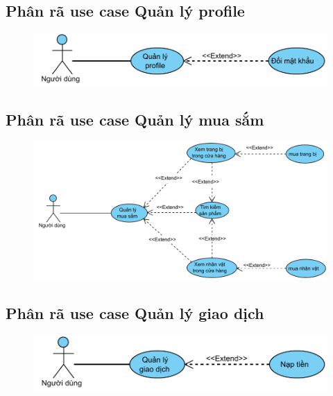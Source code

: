\documentclass[3p]{elsarticle}
\begin{document}
\subsection{Phân rã use case Quản lý profile}
\begin{figure}[!htbp]
	\hspace*{.5in}
	\centering
	\includegraphics[scale=.7]{images/usecases/gamer_ProfileManagement.pdf}
\end{figure}
\subsection{Phân rã use case Quản lý mua sắm}
\begin{figure}[!htbp]
	\hspace*{.5in}
	\centering
	\includegraphics[scale=.7]{images/usecases/gamer_ShopManagement.pdf}
\end{figure}
\subsection{Phân rã use case Quản lý giao dịch}
\begin{figure}[!htbp]
	\hspace*{.5in}
	\centering
	\includegraphics[scale=.7]{images/usecases/gamer_TransactionManagement.pdf}
\end{figure}
\newpage
\end{document}
